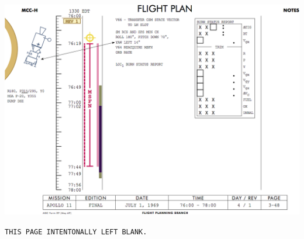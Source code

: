 \vspace*{\fill}
\begin{center}
	\includegraphics[width=.8\textwidth]{images/flightplan2}
\end{center}
\vspace*{\fill}

\newpage
\pagestyle{empty}
\vspace*{\fill}
\begin{center}
\texttt{THIS PAGE INTENTONALLY LEFT BLANK.}
\end{center}
\vspace*{\fill}



